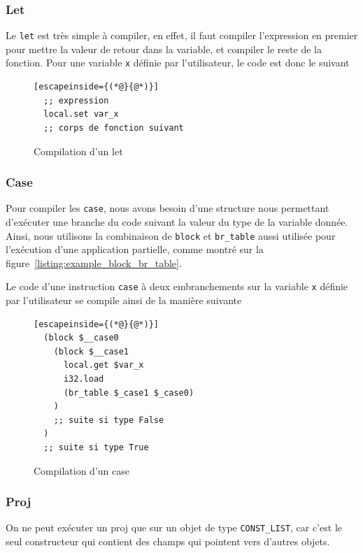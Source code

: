 \documentclass{rapportECL}
\begin{document}
\subsubsection{Let}

Le \verb|let| est très simple à compiler, en effet, il faut compiler l'expression en premier pour mettre la valeur de retour 
dans la variable, et compiler le reste de la fonction. Pour une variable \verb|x| définie par l'utilisateur, le code est donc le suivant

\begin{figure}[H]
	\begin{lstlisting}[escapeinside={(*@}{@*)}]
  ;; expression
  local.set var_x
  ;; corps de fonction suivant
	\end{lstlisting}
	\caption{Compilation d'un let}
	\label{listing:compile_let}
\end{figure}


\subsubsection{Case}

Pour compiler les \verb|case|, nous avons besoin d'une structure nous permettant d'exécuter une branche du code suivant la valeur du 
type de la variable donnée. Ainsi, nous utilisons la combinaison de \verb|block| et \verb|br_table| aussi utilisée pour l'exécution
d'une application partielle, comme montré sur la figure~\ref{listing:example_block_br_table}.

Le code d'une instruction \verb|case| à deux embranchements sur la variable \verb|x| définie par l'utilisateur 
se compile ainsi de la manière suivante


\begin{figure}[H]
	\begin{lstlisting}[escapeinside={(*@}{@*)}]
  (block $__case0
    (block $__case1
      local.get $var_x
      i32.load
      (br_table $_case1 $_case0)
	)
    ;; suite si type False
  )
  ;; suite si type True
	\end{lstlisting}
	\caption{Compilation d'un case}
	\label{listing:compile_case}
\end{figure}

\subsubsection{Proj}

On ne peut exécuter un proj que sur un objet de type \verb|CONST_LIST|, car c'est le seul constructeur qui contient des champs qui
pointent vers d'autres objets.
\end{document}
